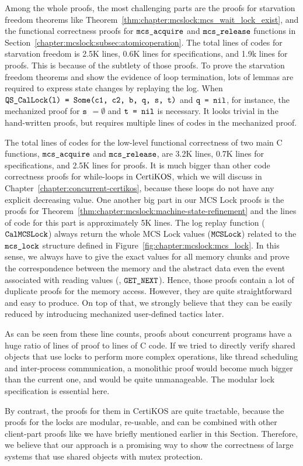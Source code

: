 Among the whole proofs, the most challenging parts are the proofs for starvation 
freedom theorems like Theorem~\ref{thm:chapter:mcslock:mcs_wait_lock_exist}, 
and the functional correctness proofs for ${\mathrm{\texttt{mcs\_acquire}}}$ 
and ${\mathrm{\texttt{mcs\_release}}}$ functions
in Section~\ref{chapter:mcslock:subsec:atomicoperation}.
The total lines of codes for starvation freedom is 2.5K lines, 0.6K lines for specifications, 
and 1.9k lines for proofs. This is because of the subtlety of those proofs. 
To prove the starvation freedom theorems and show the evidence of loop termination,
lots of lemmas are required to express
state changes by replaying the log. 
When ${\mathrm{\texttt{QS\_CalLock(l) = Some(c1, c2, b, q, s, t)}}}$
and ${\mathrm{\texttt{q = nil}}}$, 
for instance, the mechanized proof for ${\mathrm{\texttt{s}}}$ $=\emptyset$ 
and ${\mathrm{\texttt{t = nil}}}$ is necessary. It looks trivial in the hand-written proofs, 
but requires multiple lines of codes in the mechanized proof. 

The total lines of codes for the low-level functional correctness
of two main C functions, ${\mathrm{\texttt{mcs\_acquire}}}$ and ${\mathrm{\texttt{mcs\_release}}}$, are 3.2K lines,  
0.7K lines for specifications, and 2.5K lines for proofs.
It is much bigger than other code correctness proofs for while-loops in $\mathrm{CertiKOS}$, which we will
discuss in Chapter~\ref{chapter:concurrent-certikos},
because these loops do not have any explicit decreasing value.
One another big part in our MCS Lock proofs is the proofs for 
Theorem~\ref{thm:chapter:mcslock:machine-state-refinement} and the lines of code for this part is 
approximately 5K lines. The log replay function (${\mathrm{\texttt{CalMCSLock}}}$) always 
return the whole MCS Lock values (${\mathrm{\texttt{MCSLock}}}$) related 
to the  ${\mathrm{\texttt{mcs\_lock}}}$ structure defined in Figure~\ref{fig:chapter:mcslock:mcs_lock}. 
In this sense, we always have to give the exact values for all memory 
chunks and prove the correspondence between the memory and the abstract 
data even the event associated with reading values (\eg, ${\mathrm{\texttt{GET\_NEXT}}}$).
Hence, those proofs contain a lot of duplicate proofs for the memory access. 
However, they are quite straightforward and easy to produce. 
On top of that, we strongly believe 
that they can be easily reduced by introducing mechanized user-defined tactics later. 

As can be seen from these line counts, proofs about concurrent programs
have a huge ratio of lines of proof to lines of C code.
If we tried to directly verify shared objects that use locks to 
perform more complex operations, like thread scheduling
and inter-process communication, a monolithic proof  
would become much bigger than the current one, and would be quite
unmanageable. The modular lock specification is essential here.

By contrast, the proofs for them in CertiKOS are quite tractable, 
because the proofs for the locks are modular, re-usable, and can 
be combined with other client-part proofs like we have briefly 
mentioned earlier in this Section.
Therefore, we believe that our approach is a promising way to 
show the correctness of large systems that use shared objects with mutex protection. 

